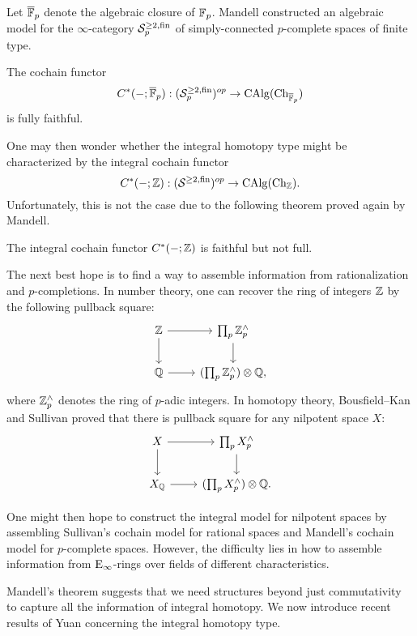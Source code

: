 Let $\overline{{\mathbb{F}}}_p$ denote the algebraic closure of ${\mathbb{F}}_p$. Mandell constructed an algebraic model for the $\infty$-category ${\mathcal{S}}^{\geq 2, \operatorname{fin}}_p$ of simply-connected $p$-complete spaces of finite type.
\begin{theorem}
    \cite{Mandell_p-adic}
    The cochain functor 
    $$
    C^*(-;\overline{{\mathbb{F}}}_p): 
    ({\mathcal{S}}^{\geq 2, \operatorname{fin}}_p)^{op} 
    \to 
    \operatorname{CAlg}(\operatorname{Ch}_{\overline{{\mathbb{F}}}_p})
    $$
    is fully faithful.
\end{theorem}
One may then wonder whether the integral homotopy type might be characterized by the integral cochain functor
$$
C^*(-;{\mathbb{Z}}): 
    ({\mathcal{S}}^{\geq 2, \operatorname{fin}})^{op} 
    \to 
    \operatorname{CAlg}(\operatorname{Ch}_{{\mathbb{Z}}}).
$$
Unfortunately, this is not the case due to the following theorem proved again by Mandell.
\begin{theorem}
    \cite{Mandell_Cochain}
    The integral cochain functor $C^*(-;{\mathbb{Z}})$ is faithful but not full.
\end{theorem}
The next best hope is to find a way to assemble information from rationalization and $p$-completions.
In number theory, one can recover the ring of integers ${\mathbb{Z}}$ by the following pullback square:
\[
\begin{tikzcd}
\BZ & \prod_{p} \BZ^{\wedge}_{p}  \\
\BQ & (\prod_{p} \BZ^{\wedge}_{p}) \otimes \BQ,
        \arrow[from=1-1, to=1-2]
		\arrow[from=2-1, to=2-2]
		\arrow[from=1-1, to=2-1]
		\arrow[from=1-2, to=2-2]
\end{tikzcd}
\]
where ${\mathbb{Z}}^{\wedge}_p$ denotes the ring of $p$-adic integers. In homotopy theory, Bousfield--Kan \cite{Bousfield-KanYellow} and Sullivan \cite{Sullivan05} proved that there is pullback square for any nilpotent space $X$:
\[
\begin{tikzcd}
X & \prod_{p} X^{\wedge}_{p}  \\
X_\BQ & (\prod_{p} X^{\wedge}_{p}) \otimes \BQ.
        \arrow[from=1-1, to=1-2]
		\arrow[from=2-1, to=2-2]
		\arrow[from=1-1, to=2-1]
		\arrow[from=1-2, to=2-2]
\end{tikzcd}
\]

One might then hope to construct the integral model for nilpotent spaces by assembling Sullivan's cochain model for rational spaces and Mandell's cochain model for $p$-complete spaces. However, the difficulty lies in how to assemble information from $\operatorname{E}_{\infty}$-rings over fields of different characteristics.

Mandell's theorem suggests that we need structures beyond just commutativity to capture all the information of integral homotopy.
We now introduce recent results of Yuan \cite{Yuan} concerning the integral homotopy type.

